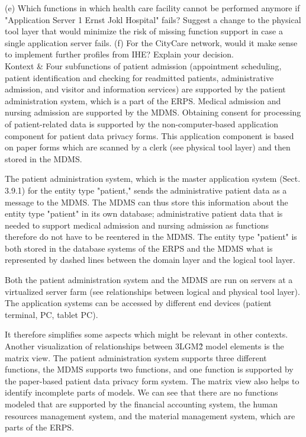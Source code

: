 (e) Which functions in which health care facility cannot be performed anymore if "Application Server 1 Ernst Jokl Hospital" fails? Suggest a change to the physical tool layer that would minimize the risk of missing function support in case a single application server fails.
(f) For the CityCare network, would it make sense to implement further profiles from IHE? Explain your decision. \\
Kontext & Four subfunctions of patient admission (appointment scheduling, patient identification and checking for readmitted patients, administrative admission, and visitor and information services) are supported by the patient administration system, which is a part of the ERPS.
Medical admission and nursing admission are supported by the MDMS.
Obtaining consent for processing of patient-related data is supported by the non-computer-based application component for patient data privacy forms.
This application component is based on paper forms which are scanned by a clerk (see physical tool layer) and then stored in the MDMS.

The patient administration system, which is the master application system (Sect. 3.9.1) for the entity type "patient," sends the administrative patient data as a message to the MDMS.
The MDMS can thus store this information about the entity type "patient" in its own database; administrative patient data that is needed to support medical admission and nursing admission as functions therefore do not have to be reentered in the MDMS.
The entity type "patient" is both stored in the database systems of the ERPS and the MDMS what is represented by dashed lines between the domain layer and the logical tool layer.

Both the patient administration system and the MDMS are run on servers at a virtualized server farm (see relationships between logical and physical tool layer). The application systems can be accessed by different end devices (patient terminal, PC, tablet PC).

It therefore simplifies some aspects which might be relevant in other contexts.
Another visualization of relationships between 3LGM\^2 model elements is the matrix view.
The patient administration system supports three different functions, the MDMS supports two functions, and one function is supported by the paper-based patient data privacy form system.
The matrix view also helps to identify incomplete parts of models.
We can see that there are no functions modeled that are supported by the financial accounting system, the human resources management system, and the material management system, which are parts of the ERPS.

